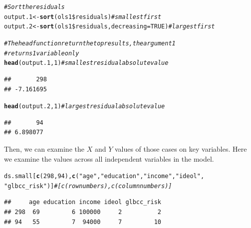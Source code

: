 \documentclass[11pt,openany]{book}\usepackage[]{graphicx}\usepackage[]{color}
\makeatletter
\newcommand{\hlnum}[1]{\textcolor[rgb]{0.686,0.059,0.569}{#1}}%
\newcommand{\hlstr}[1]{\textcolor[rgb]{0.192,0.494,0.8}{#1}}%
\newcommand{\hlcom}[1]{\textcolor[rgb]{0.678,0.584,0.686}{\textit{#1}}}%
\newcommand{\hlopt}[1]{\textcolor[rgb]{0,0,0}{#1}}%
\newcommand{\hlstd}[1]{\textcolor[rgb]{0.345,0.345,0.345}{#1}}%
\newcommand{\hlkwb}[1]{\textcolor[rgb]{0.69,0.353,0.396}{#1}}%
\newcommand{\hlkwc}[1]{\textcolor[rgb]{0.333,0.667,0.333}{#1}}%
\newcommand{\hlkwd}[1]{\textcolor[rgb]{0.737,0.353,0.396}{\textbf{#1}}}%
\newenvironment{kframe}{%
 \def\at@end@of@kframe{}%
 \ifinner\ifhmode%
  \def\at@end@of@kframe{\end{minipage}}%
  \begin{minipage}{\columnwidth}%
 \fi\fi%
 \def\FrameCommand##1{\hskip\@totalleftmargin \hskip-\fboxsep
 \colorbox{shadecolor}{##1}\hskip-\fboxsep
     \hskip-\linewidth \hskip-\@totalleftmargin \hskip\columnwidth}%
 \MakeFramed {\advance\hsize-\width
   \@totalleftmargin\z@ \linewidth\hsize
   \@setminipage}}%
 {\par\unskip\endMakeFramed%
 \at@end@of@kframe}
\newenvironment{knitrout}{}{} %
\renewenvironment{knitrout}{\begin{singlespace}}{\end{singlespace}}
\makeatother
\begin{document}
\begin{knitrout}
\color{fgcolor}\begin{kframe}
\begin{alltt}
\hlcom{# Sort the residuals}
\hlstd{output.1} \hlkwb{<-} \hlkwd{sort}\hlstd{(ols1}\hlopt{\$}\hlstd{residuals)}  \hlcom{# smallest first}
\hlstd{output.2} \hlkwb{<-} \hlkwd{sort}\hlstd{(ols1}\hlopt{\$}\hlstd{residuals,} \hlkwc{decreasing} \hlstd{=} \hlnum{TRUE}\hlstd{)}  \hlcom{# largest first}

\hlcom{# The head function return the top results, the argument 1}
\hlcom{# returns 1 variable only}
\hlkwd{head}\hlstd{(output.1,} \hlnum{1}\hlstd{)}  \hlcom{# smallest residual absolute value}
\end{alltt}
\begin{verbatim}
##       298 
## -7.161695
\end{verbatim}
\begin{alltt}
\hlkwd{head}\hlstd{(output.2,} \hlnum{1}\hlstd{)}  \hlcom{# largest residual absolute value}
\end{alltt}
\begin{verbatim}
##       94 
## 6.898077
\end{verbatim}
\end{kframe}
\end{knitrout}

Then, we can examine the $X$ and $Y$ values of those cases on key variables. Here we examine the values across all independent variables in the model.  

\begin{knitrout}
\color{fgcolor}\begin{kframe}
\begin{alltt}
\hlstd{ds.small[}\hlkwd{c}\hlstd{(}\hlnum{298}\hlstd{,} \hlnum{94}\hlstd{),} \hlkwd{c}\hlstd{(}\hlstr{"age"}\hlstd{,} \hlstr{"education"}\hlstd{,} \hlstr{"income"}\hlstd{,} \hlstr{"ideol"}\hlstd{,}
    \hlstr{"glbcc_risk"}\hlstd{)]}  \hlcom{# [c(row numbers),c(column numbers)]}
\end{alltt}
\begin{verbatim}
##     age education income ideol glbcc_risk
## 298  69         6 100000     2          2
## 94   55         7  94000     7         10
\end{verbatim}
\end{kframe}
\end{knitrout}
\end{document}
